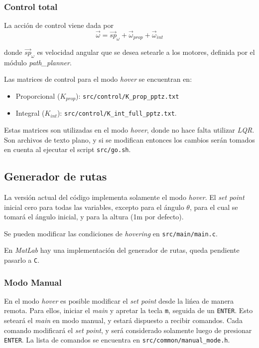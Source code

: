 \documentclass[main]{subfiles}
\begin{document}
\subsubsection{Control total}
\label{sec:software:control-total}

La acci\'on de control viene dada por
\begin{equation}
  \label{eq:software:control}
  \vec{\omega} = \vec{sp}_\omega + \vec{\omega}_{prop} + \vec{\omega}_{int}
\end{equation}

donde $\vec{sp}_\omega$ es velocidad angular que se desea setearle a los motores, definida por el m\'odulo \textit{path\_planner}.

Las matrices de control para el modo \textit{hover} se encuentran en:
\begin{itemize}
\item Proporcional ($K_{prop}$): \verb+src/control/K_prop_pptz.txt+
\item Integral ($K_{int}$): \verb+src/control/K_int_full_pptz.txt+.
\end{itemize}

Estas matrices son utilizadas en el modo \textit{hover}, donde no hace falta utilizar \textit{LQR}. Son archivos de texto plano, y si se modifican entonces los cambios ser\'an tomados en cuenta al ejecutar el script \verb+src/go.sh+.

\subsection{Generador de rutas}
\label{sec:software:generador-de-rutas}

La versi\'on actual del c\'odigo implementa solamente el modo \textit{hover}. El \textit{set point} inicial cero para todas las variables, excepto para el \'angulo $\theta$, para el cual se tomar\'a el \'angulo inicial, y para la altura (1m por defecto).

Se pueden modificar las condiciones de \textit{hovering} en \verb+src/main/main.c+.

En \textit{MatLab} hay una implementaci\'on del generador de rutas, queda pendiente pasarlo a \verb+C+.

\subsubsection{Modo Manual}
\label{sec:software:modo-manual}

En el modo \textit{hover} es posible modificar el \textit{set point} desde la li\'nea de manera remota. Para ellos, iniciar el \textit{main} y apretar la tecla \verb+m+, seguida de un \verb+ENTER+. Esto setear\'a el \textit{main} en modo manual, y estar\'a dispuesto a recibir comandos. Cada comando modificar\'a el \textit{set point}, y ser\'a considerado solamente luego de presionar \verb+ENTER+. La lista de comandos se encuentra en \verb+src/common/manual_mode.h+.
\end{document}
